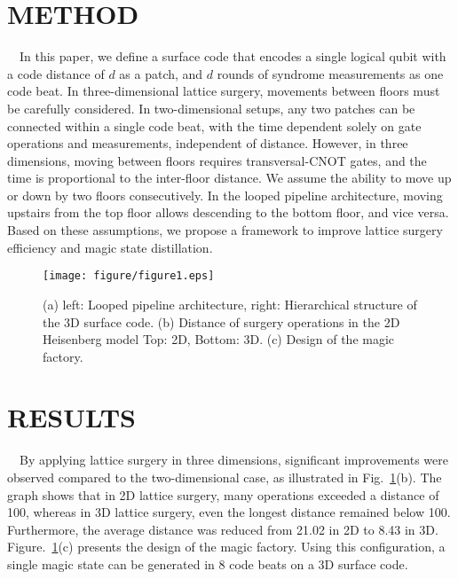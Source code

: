   \section{METHOD}
  \vspace{-8pt}
  \ \ In this paper, we define a surface code that encodes a single logical qubit with a code distance of $d$ as a patch, and $d$ rounds of syndrome measurements as one code beat. In three-dimensional lattice surgery, movements between floors must be carefully considered. In two-dimensional setups, any two patches can be connected within a single code beat, with the time dependent solely on gate operations and measurements, independent of distance. However, in three dimensions, moving between floors requires transversal-CNOT gates, and the time is proportional to the inter-floor distance. We assume the ability to move up or down by two floors consecutively. In the looped pipeline architecture, moving upstairs from the top floor allows descending to the bottom floor, and vice versa. Based on these assumptions, we propose a framework to improve lattice surgery efficiency and magic state distillation.
  \begin{figure}[t]
    \centering
    \texttt{[image: figure/figure1.eps]}
    \vspace{-10pt}\caption{(a) left: Looped pipeline architecture, right:  Hierarchical structure of the 3D surface code. (b) Distance of surgery operations in the 2D Heisenberg model Top: 2D, Bottom: 3D. (c) Design of the magic factory.}
    \label{figure1}
    \vspace{-15pt}
  \end{figure}
  \section{RESULTS}
  \vspace{-8pt}
  \ \ By applying lattice surgery in three dimensions, significant improvements were observed compared to the two-dimensional case, as illustrated in Fig.\ \ref{figure1}(b). The graph shows that in 2D lattice surgery, many operations exceeded a distance of 100, whereas in 3D lattice surgery, even the longest distance remained below 100. Furthermore, the average distance was reduced from 21.02 in 2D to 8.43 in 3D. Figure.\ \ref{figure1}(c) presents the design of the magic factory. Using this configuration, a single magic state can be generated in 8 code beats on a 3D surface code.

